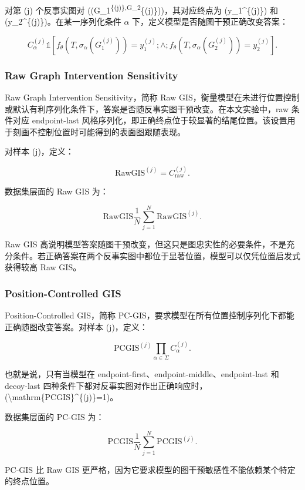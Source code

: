 \documentclass[
  11pt,
]{article}
\begin{document}
对第 (j) 个反事实图对
((G\_1\textsuperscript{\{(j)\},G\_2}\{(j)\}))，其对应终点为
(y\_1\^{}\{(j)\}) 和 (y\_2\^{}\{(j)\})。在某一序列化条件 \(\alpha\)
下，定义模型是否随图干预正确改变答案：

\[
C_{\alpha}^{(j)}
\mathbb{1}  
\left[  
f_\theta(T,\sigma_\alpha(G_1^{(j)}))=y_1^{(j)}  
;\wedge;  
f_\theta(T,\sigma_\alpha(G_2^{(j)}))=y_2^{(j)}  
\right].  
\]

\subsubsection{Raw Graph Intervention
Sensitivity}\label{raw-graph-intervention-sensitivity}

Raw Graph Intervention Sensitivity，简称 Raw
GIS，衡量模型在未进行位置控制或默认有利序列化条件下，答案是否随反事实图干预改变。在本文实验中，raw
条件对应 endpoint-last
风格序列化，即正确终点位于较显著的结尾位置。该设置用于刻画不控制位置时可能得到的表面图跟随表现。

对样本 (j)，定义：

\[
\mathrm{RawGIS}^{(j)}=C_{\text{raw}}^{(j)}.  
\]

数据集层面的 Raw GIS 为：

\[
\mathrm{RawGIS}
\frac{1}{N}\sum_{j=1}^{N}\mathrm{RawGIS}^{(j)}.  
\]

Raw GIS
高说明模型答案随图干预改变，但这只是图忠实性的必要条件，不是充分条件。若正确答案在两个反事实图中都位于显著位置，模型可以仅凭位置启发式获得较高
Raw GIS。

\subsubsection{Position-Controlled GIS}\label{position-controlled-gis}

Position-Controlled GIS，简称
PC-GIS，要求模型在所有位置控制序列化下都能正确随图改变答案。对样本
(j)，定义：

\[
\mathrm{PCGIS}^{(j)}
\prod_{\alpha\in\Sigma}  
C_{\alpha}^{(j)}.  
\]

也就是说，只有当模型在 endpoint-first、endpoint-middle、endpoint-last 和
decoy-last
四种条件下都对反事实图对作出正确响应时，(\textbackslash mathrm\{PCGIS\}\^{}\{(j)\}=1)。

数据集层面的 PC-GIS 为：

\[
\mathrm{PCGIS}
\frac{1}{N}\sum_{j=1}^{N}\mathrm{PCGIS}^{(j)}.  
\]

PC-GIS 比 Raw GIS
更严格，因为它要求模型的图干预敏感性不能依赖某个特定的终点位置。
\end{document}
